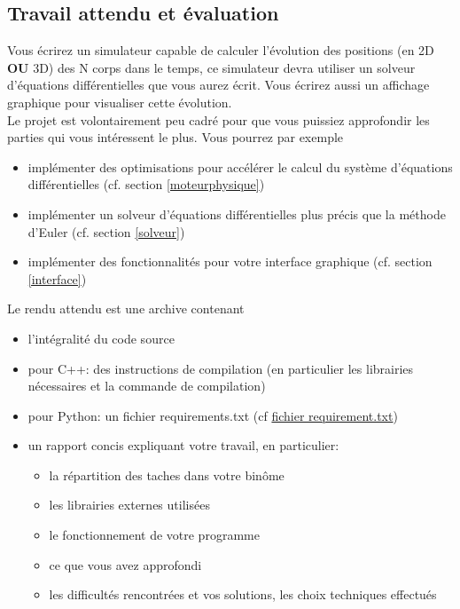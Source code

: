 \documentclass{article}
\begin{document}
\subsection{Travail attendu et évaluation}

Vous écrirez un simulateur capable de calculer l'évolution des positions (en 2D \textbf{OU} 3D) des N corps dans le temps, ce simulateur devra utiliser un solveur d'équations différentielles que vous aurez écrit. Vous écrirez aussi un affichage graphique pour visualiser cette évolution. \\
Le projet est volontairement peu cadré pour que vous puissiez approfondir les parties qui vous intéressent le plus. Vous pourrez par exemple
\begin{itemize}
    \item implémenter des optimisations pour accélérer le calcul du système d'équations différentielles (cf. section \ref{moteurphysique})
    \item implémenter un solveur d'équations différentielles plus précis que la méthode d'Euler (cf. section \ref{solveur})
    \item implémenter des fonctionnalités pour votre interface graphique (cf. section \ref{interface})
\end{itemize}

\vspace{1em}

\noindent Le rendu attendu est une archive contenant
\begin{itemize}
    \item l'intégralité du code source
    \item pour C++: des instructions de compilation (en particulier les librairies nécessaires et la commande de compilation)
    \item pour Python: un fichier requirements.txt (cf \href{https://pip.pypa.io/en/stable/user_guide/#requirements-files}{fichier requirement.txt})
    \item un rapport concis expliquant votre travail, en particulier:
    \begin{itemize}
        \item la répartition des taches dans votre binôme
        \item les librairies externes utilisées
        \item le fonctionnement de votre programme
        \item ce que vous avez approfondi
        \item les difficultés rencontrées et vos solutions, les choix techniques effectués
    \end{itemize}
\end{itemize}
\end{document}
